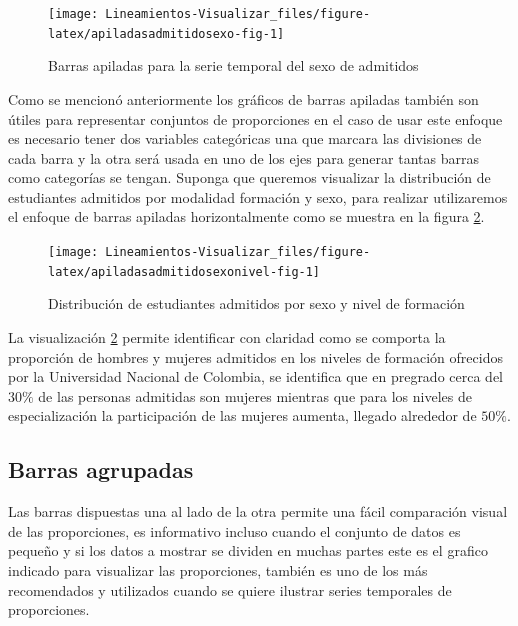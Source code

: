 \documentclass[
]{book}
\begin{document}
\begin{figure}

{\centering \texttt{[image: Lineamientos-Visualizar\_files/figure-latex/apiladasadmitidosexo-fig-1]} 

}

\caption{Barras apiladas para la serie temporal del sexo de admitidos}\label{fig:apiladasadmitidosexo-fig}
\end{figure}

Como se mencionó anteriormente los gráficos de barras apiladas también son útiles para representar conjuntos de proporciones en el caso de usar este enfoque es necesario tener dos variables categóricas una que marcara las divisiones de cada barra y la otra será usada en uno de los ejes para generar tantas barras como categorías se tengan. Suponga que queremos visualizar la distribución de estudiantes admitidos por modalidad formación y sexo, para realizar utilizaremos el enfoque de barras apiladas horizontalmente como se muestra en la figura \ref{fig:apiladasadmitidosexonivel-fig}.

\begin{figure}

{\centering \texttt{[image: Lineamientos-Visualizar\_files/figure-latex/apiladasadmitidosexonivel-fig-1]} 

}

\caption{Distribución de estudiantes admitidos por sexo y nivel de formación}\label{fig:apiladasadmitidosexonivel-fig}
\end{figure}

La visualización \ref{fig:apiladasadmitidosexonivel-fig} permite identificar con claridad como se comporta la proporción de hombres y mujeres admitidos en los niveles de formación ofrecidos por la Universidad Nacional de Colombia, se identifica que en pregrado cerca del \(30\%\) de las personas admitidas son mujeres mientras que para los niveles de especialización la participación de las mujeres aumenta, llegado alrededor de \(50\%\).

\hypertarget{barras-agrupadas}{%
\subsection{Barras agrupadas}\label{barras-agrupadas}}

Las barras dispuestas una al lado de la otra permite una fácil comparación visual de las proporciones, es informativo incluso cuando el conjunto de datos es pequeño y si los datos a mostrar se dividen en muchas partes este es el grafico indicado para visualizar las proporciones, también es uno de los más recomendados y utilizados cuando se quiere ilustrar series temporales de proporciones.
\end{document}
